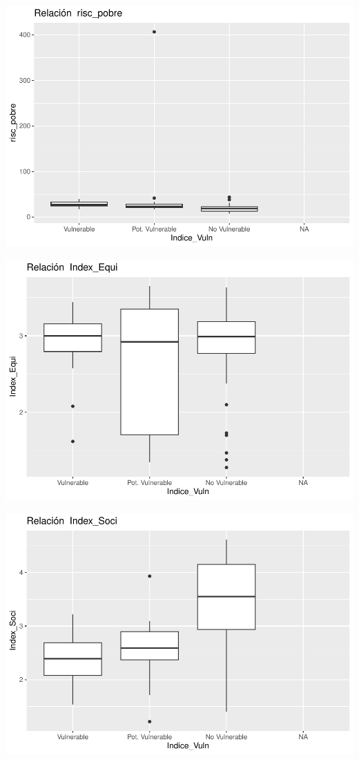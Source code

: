 \documentclass[notspecified,article,submit,moreauthors,pdftex]{Definitions/mdpi}
\begin{document}
\begin{center}\includegraphics{./figure/unnamed-chunk-23-5} \end{center}

\begin{center}\includegraphics{./figure/unnamed-chunk-23-6} \end{center}

\begin{center}\includegraphics{./figure/unnamed-chunk-23-7} \end{center}
\end{document}
